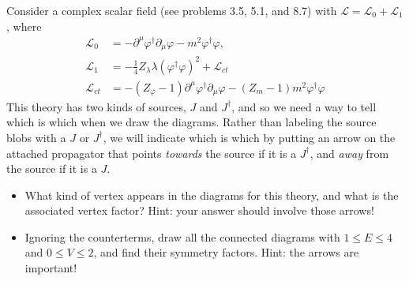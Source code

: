 \documentclass[twoside]{amsart}
\newcommand{\problemhead}[1]
  {\smallskip
   \noindent{\large\bf Problem #1.}
   }
\begin{document}
\problemhead{9.3} Consider a complex scalar field (see problems 3.5, 5.1, and 8.7) with $\mathcal{L} = \mathcal{L}_0 + \mathcal{L}_1$, where
\[
\begin{aligned}
  \mathcal{L}_0 & = - \partial^{\mu} \varphi^{\dag} \partial_{\mu} \varphi - m^2 \varphi^{\dag} \varphi, \\
  \mathcal{L}_1 & = - \frac{1}{4} Z_{\lambda}\lambda (\varphi^{\dag} \varphi)^2 + \mathcal{L}_{ct} \\ 
  \mathcal{L}_{ct} & = -(Z_{\varphi} - 1)\partial^{\mu} \varphi^{\dag} \partial_{\mu} \varphi - (Z_m -1) m^2 \varphi^{\dag} \varphi 
\end{aligned}
\]
This theory has two kinds of sources, $J$ and $J^{\dag}$, and so we need a way to tell which is which when we draw the diagrams.  Rather than labeling the source blobs with a $J$ or $J^{\dag}$, we will indicate which is which by putting an arrow on the attached propagator that points \emph{towards} the source if it is a $J^{\dag}$, and \emph{away} from the source if it is a $J$.  
\begin{itemize}
\item[(a)] What kind of vertex appears in the diagrams for this theory, and what is the associated vertex factor?  Hint: your answer should involve those arrows!
\item[(b)] Ignoring the counterterms, draw all the connected diagrams with $1 \leq E \leq 4$ and $0\leq V \leq 2$, and find their symmetry factors.  Hint: the arrows are important!   
\end{itemize}
\end{document}
